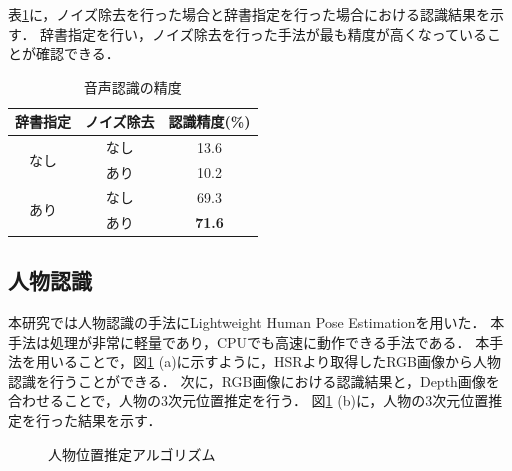 \documentclass[a4j]{jarticle}
\begin{document}
表\ref{voice_recognition_result}に，ノイズ除去を行った場合と辞書指定を行った場合における認識結果を示す．
辞書指定を行い，ノイズ除去を行った手法が最も精度が高くなっていることが確認できる．
\begin{table}[]
	\centering
	\caption{音声認識の精度}
	\begin{tabular}{|c|c|c|}
	\hline
	辞書指定                & ノイズ除去 & 認識精度(\%)          \\ \hline
	\multirow{2}{*}{なし} & なし    & 13.6          \\ \cline{2-3}
	                    & あり    & 10.2          \\ \hline
	\multirow{2}{*}{あり} & なし    & 69.3          \\ \cline{2-3}
	                    & あり    & \textbf{71.6} \\ \hline
	\end{tabular}
	\label{voice_recognition_result}
\end{table}

\subsection{人物認識}
本研究では人物認識の手法にLightweight Human Pose Estimation\cite{light-openpose}を用いた．
本手法は処理が非常に軽量であり，CPUでも高速に動作できる手法である．
本手法を用いることで，図\ref{human_estimation_explain} (a)に示すように，HSRより取得したRGB画像から人物認識を行うことができる．
次に，RGB画像における認識結果と，Depth画像を合わせることで，人物の3次元位置推定を行う．
図\ref{human_estimation_explain} (b)に，人物の3次元位置推定を行った結果を示す．
\begin{figure}[b]
  \centering
  \caption{人物位置推定アルゴリズム}
  \label{human_estimation_explain}
\end{figure}
\end{document}
